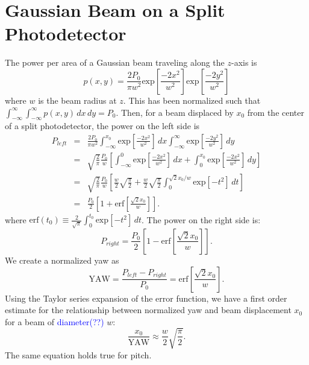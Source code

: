 \section{Gaussian Beam on a Split Photodetector}
\label{app:beamonQPD}
The power per area of a Gaussian beam traveling along the $z$-axis is 
\begin{equation}
p(x,y) = \frac{2 P_0}{\pi w^2} \mbox{exp}\left[\frac{-2x^2}{w^2}\right] \mbox{exp}\left[\frac{-2y^2}{w^2}\right]
\end{equation}
where $w$ is the beam radius at $z$.  This has been normalized such
that $\int_{-\infty}^\infty \int_{-\infty}^\infty p(x,y) \,dx \,dy =
P_0$. Then, for a beam displaced by $x_0$ from the center of a split
photodetector, the power on the left side is
\begin{eqnarray} 
P_{left} &=& \frac{2 P_0}{\pi w^2} \int_{-\infty}^{x_0} \mbox{exp}\left[\frac{-2x^2}{w^2}\right]  \,dx \int_{-\infty}^\infty \mbox{exp}\left[\frac{-2y^2}{w^2}\right] \,dy \\
&=& \sqrt{\frac{2}{\pi}} \frac{P_0}{w} \left[ \int_{-\infty}^{0} \mbox{exp}\left[\frac{-2x^2}{w^2}\right]  \,dx + \int_0^{x_0} \mbox{exp}\left[\frac{-2x^2}{w^2}\right] \,dy \right] \\
&=& \sqrt{\frac{2}{\pi}} \frac{P_0}{w} \left[ \frac{w}{2} \sqrt{\frac{\pi}{2}} + \frac{w}{2} \sqrt{\frac{\pi}{2}} \int_0^{\sqrt{2} x_0 / w} \mbox{exp}\left[-t^2 \right] \,dt  \right] \\
&=& \frac{P_0}{2} \left[1 + \mbox{erf}\left[ \frac{\sqrt{2} x_0}{w} \right] \right].
\end{eqnarray}
where $\mathrm{erf}(t_0) \equiv \frac{2}{\sqrt{\pi}} \int_0^{t_0}
\mbox{exp}\left[-t^2 \right] \,dt$. The power on the right side is:
\begin{equation}
P_{right} = \frac{P_0}{2} \left[1 - \mbox{erf}\left[ \frac{\sqrt{2} x_0}{w} \right] \right].
\end{equation}
We create a normalized yaw as
\begin{equation}
\mathrm{YAW} = \frac{P_{left} - P_{right}}{P_0} = \mathrm{erf}\left[ \frac{\sqrt{2} x_0}{w} \right].
\end{equation}
Using the Taylor series expansion of the error function, we have a
first order estimate for the relationship between normalized yaw and
beam displacement $x_0$ for a beam of \textcolor{blue}{diameter(??)} $w$:
\begin{equation}
\frac{x_0}{\mathrm{YAW}} \approx \frac{w}{2} \sqrt{\frac{\pi}{2}}.
\end{equation}
The same equation holds true for pitch.





